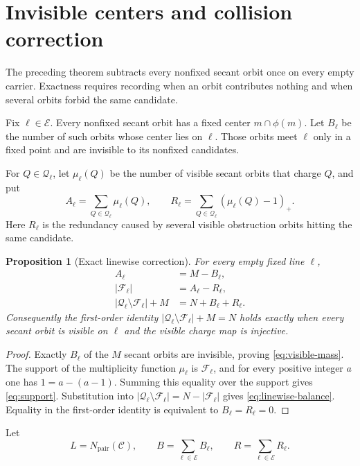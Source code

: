 \documentclass[11pt]{article}
\newtheorem{proposition}[theorem]{Proposition}
\theoremstyle{definition}
\theoremstyle{remark}
\newcommand{\cC}{\mathcal{C}}
\newcommand{\cE}{\mathcal{E}}
\newcommand{\cQ}{\mathcal{Q}}
\newcommand{\cF}{\mathcal{F}}
\newcommand{\Npair}{N_{\mathrm{pair}}}
\newcommand{\pospart}[1]{\left(#1\right)_{+}}
\begin{document}
\section{Invisible centers and collision correction}

The preceding theorem subtracts every nonfixed secant orbit once on every
empty carrier.  Exactness requires recording when an orbit contributes
nothing and when several orbits forbid the same candidate.

Fix $\ell\in\cE$.  Every nonfixed secant orbit has a fixed center
$m\cap\phi(m)$.  Let $B_\ell$ be the number of such orbits whose center
lies on $\ell$.  Those orbits meet $\ell$ only in a fixed point and are
invisible to its nonfixed candidates.

For $Q\in\cQ_\ell$, let $\mu_\ell(Q)$ be the number of visible secant
orbits that charge $Q$, and put
\[
 A_\ell=\sum_{Q\in\cQ_\ell}\mu_\ell(Q),
 \qquad
 R_\ell=\sum_{Q\in\cQ_\ell}
     \pospart{\mu_\ell(Q)-1}.
\]
Here $R_\ell$ is the redundancy caused by several visible obstruction
orbits hitting the same candidate.

\begin{proposition}[Exact linewise correction]\label{prop:linewise}
For every empty fixed line $\ell$,
\begin{align}
 A_\ell&=M-B_\ell,\label{eq:visible-mass}\\
 |\cF_\ell|&=A_\ell-R_\ell,\label{eq:support}\\
 |\cQ_\ell\setminus\cF_\ell|+M
   &=N+B_\ell+R_\ell.\label{eq:linewise-balance}
\end{align}
Consequently the first-order identity
$|\cQ_\ell\setminus\cF_\ell|+M=N$ holds exactly when every secant orbit is
visible on $\ell$ and the visible charge map is injective.
\end{proposition}

\begin{proof}
Exactly $B_\ell$ of the $M$ secant orbits are invisible, proving
\eqref{eq:visible-mass}.  The support of the multiplicity function
$\mu_\ell$ is $\cF_\ell$, and for every positive integer $a$ one has
$1=a-(a-1)$.  Summing this equality over the support gives
\eqref{eq:support}.  Substitution into
$|\cQ_\ell\setminus\cF_\ell|=N-|\cF_\ell|$ gives
\eqref{eq:linewise-balance}.  Equality in the first-order identity is
equivalent to $B_\ell=R_\ell=0$.
\end{proof}

Let
\[
 L=\Npair(\cC),\qquad
 B=\sum_{\ell\in\cE}B_\ell,
 \qquad
 R=\sum_{\ell\in\cE}R_\ell.
\]
\end{document}
